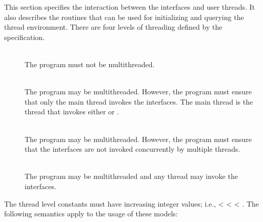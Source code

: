 This section specifies the interaction between the \openshmem interfaces and
user threads.  It also describes the routines that can be used for initializing and
querying the thread environment. There are four levels of threading defined by
the \openshmem specification.

\begin{description}
\item[] \hfill \\
The \openshmem program must not be multithreaded.

\item[] \hfill \\
The \openshmem program may be multithreaded. However, the program must ensure
that only the main thread invokes the \openshmem interfaces. The main thread
is the thread that invokes either  or .

\item[] \hfill \\
The \openshmem program may be multithreaded. However, the program must ensure
that the \openshmem interfaces are not invoked concurrently by multiple threads.

\item[] \hfill \\
The \openshmem program may be multithreaded and any thread may invoke the \openshmem
interfaces.
\end{description}

\sloppypar
\noindent The thread level constants must have increasing integer values; i.e.,
 <  <
 < .
The following semantics apply to the usage of these models:

